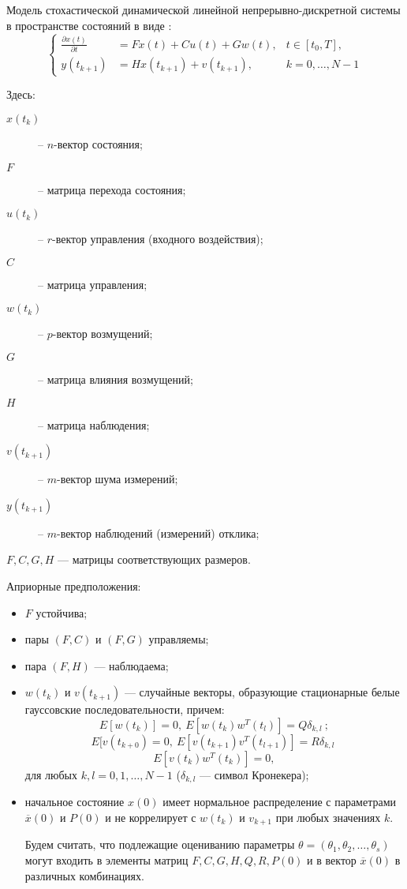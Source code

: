 \documentclass[a4paper,14pt]{extarticle}
\renewcommand{\vec}[1]{#1}
\newcommand{\pd}[2]{\frac{\partial #1}{\partial #2}}
\begin{document}
Модель стохастической динамической линейной непрерывно-дискретной системы в
пространстве состояний в виде \cite{mono}:
\begin{equation}
  \label{eq:initmod}
  \left\{ 
    \begin{array}{lll}
			\pd{\vec{x}(t)}{t} &= F \vec{x}(t) + C \vec{u}(t) + G \vec{w}(t),
				& t \in [t_0, T], \\
      \vec{y}(t_{k+1}) &= H \vec{x}(t_{k+1}) + \vec{v}(t_{k+1}), 
				& k = 0,\ldots, N-1
    \end{array} 
  \right. 
\end{equation}

Здесь:
\begin{description}
  \item [$\vec{x}(t_k)$] -- $n$-вектор состояния;
  \item [$F$] -- матрица перехода состояния;
  \item [$\vec{u}(t_k)$] -- $r$-вектор управления (входного воздействия);
  \item [$C$] -- матрица управления;
  \item [$\vec{w}(t_k)$] -- $p$-вектор возмущений;
  \item [$G$] -- матрица влияния возмущений;
  \item [$H$] -- матрица наблюдения;
  \item [$\vec{v}(t_{k+1})$] -- $m$-вектор шума измерений;
  \item [$\vec{y}(t_{k+1})$] -- $m$-вектор наблюдений (измерений) отклика;
\end{description}

$F, C, G, H$ --- матрицы соответствующих размеров.

\bigskip
Априорные предположения:
\begin{itemize}
\item $F$ устойчива;
\item пары $(F, C)$ и $(F, G)$ управляемы;
\item пара $(F, H)$ --- наблюдаема;
\item $\vec{w}(t_k)$ и $\vec{v}(t_{k+1})$ --- случайные векторы, образующие
стационарные белые гауссовские последовательности, причем:
\[
E[\vec{w}(t_k)] = 0,\ E[\vec{w}(t_k)\vec{w}^{T}(t_l)] = Q \delta_{k,l}\ ;
\]
\[
E[\vec{v}(t_{k+0}) = 0,\ E[\vec{v}(t_{k+1})\vec{v}^{T}(t_{l+1})] = R
\delta_{k,l}\;
\]
\[
E[\vec{v}(t_k)\vec{w}^{T}(t_k)] = 0,
\]
для любых $k, l = 0, 1, \ldots, N-1$ ($\delta_{k,l}$ --- символ Кронекера);

\item начальное состояние $\vec{x}(0)$ имеет нормальное распределение с
параметрами $\overline{\vec{x}}(0)$ и $P(0)$ и не коррелирует с $\vec{w(t_k)}$
и $\vec{v_{k+1}}$ при любых значениях $k$.

Будем считать, что подлежащие оцениванию параметры $\theta = (\theta_1,
\theta_2, \ldots, \theta_s)$ могут входить в элементы матриц $F, C, G, H, Q, R,
P(0)$ и в вектор $\overline{\vec{x}}(0)$ в различных комбинациях.

\end{itemize}
\end{document}
